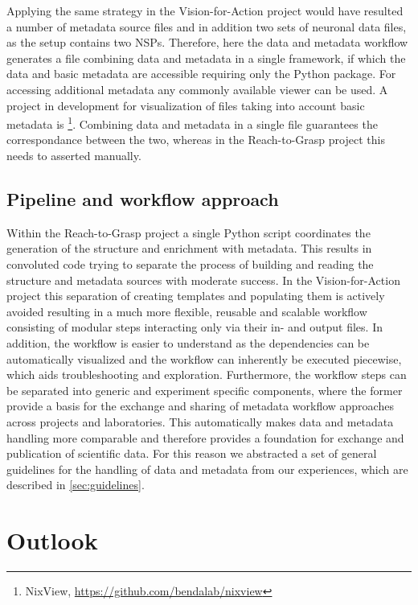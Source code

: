 Applying the same strategy in the Vision-for-Action project would have resulted a number of metadata source files and in addition two sets of neuronal data files, as the setup contains two NSPs. Therefore, here the data and metadata workflow generates a  file combining data and metadata in a single framework, if which the data and basic metadata are accessible requiring only the Python  package. For accessing additional metadata any commonly available  viewer can be used. A project in development for visualization of  files taking into account basic metadata is \footnote{NixView, \url{https://github.com/bendalab/nixview}}. Combining data and metadata in a single file guarantees the correspondance between the two, whereas in the Reach-to-Grasp project this needs to asserted manually.

\subsection{Pipeline and workflow approach}
Within the Reach-to-Grasp project a single Python script coordinates the generation of the  structure and enrichment with metadata. This results in convoluted code trying to separate the process of building and reading the  structure and metadata sources with moderate success. In the Vision-for-Action project this separation of creating templates and populating them is actively avoided resulting in a much more flexible, reusable and scalable workflow consisting of modular steps interacting only via their in- and output files. In addition, the workflow is easier to understand as the dependencies can be automatically visualized and the workflow can inherently be executed piecewise, which aids troubleshooting and exploration. Furthermore, the workflow steps can be separated into generic and experiment specific components, where the former provide a basis for the exchange and sharing of metadata workflow approaches across projects and laboratories. This automatically makes data and metadata handling more comparable and therefore provides a foundation for exchange and publication of scientific data. For this reason we abstracted a set of general guidelines for the handling of data and metadata from our experiences, which are described in \cref{sec:guidelines}.


\section{Outlook}
